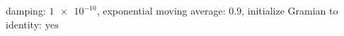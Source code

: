 damping: $\num[scientific-notation=true]{1e-10}$, exponential moving average: $\num[scientific-notation=true]{0.9}$, initialize Gramian to identity: $\text{yes}$